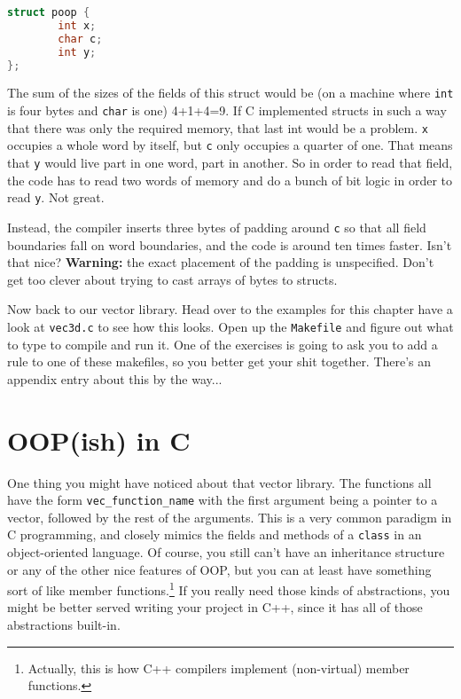 \documentclass[ebook,11pt,oneside,openany]{memoir}
\newcommand{\cf}[1]{\texttt{#1}}
\begin{document}
\begin{lstlisting}[language=C]
struct poop {
        int x;
        char c;
        int y;
};
\end{lstlisting}

The sum of the sizes of the fields of this struct would be (on a machine where \cf{int} is four bytes and \cf{char} is one) 4+1+4=9. If C implemented structs in such a way that there was only the required memory, that last int would be a problem. \cf{x} occupies a whole word by itself, but \cf{c} only occupies a quarter of one. That means that \cf{y} would live part in one word, part in another. So in order to read that field, the code has to read two words of memory and do a bunch of bit logic in order to read \cf{y}. Not great.

Instead, the compiler inserts three bytes of padding around \cf{c} so that all field boundaries fall on word boundaries, and the code is around ten times faster. Isn't that nice? \textbf{Warning:} the exact placement of the padding is unspecified. Don't get too clever about trying to cast arrays of bytes to structs.

Now back to our vector library. Head over to the examples for this chapter have a look at \cf{vec3d.c} to see how this looks. Open up the \cf{Makefile} and figure out what to type to compile and run it. One of the exercises is going to ask you to add a rule to one of these makefiles, so you better get your shit together. There's an appendix entry about this by the way...

\section{OOP(ish) in C}

One thing you might have noticed about that vector library. The functions all have the form \cf{vec\_function\_name} with the first argument being a pointer to a vector, followed by the rest of the arguments. This is a very common paradigm in C programming, and closely mimics the fields and methods of a \cf{class} in an object-oriented language. Of course, you still can't have an inheritance structure or any of the other nice features of OOP, but you can at least have something sort of like member functions.\footnote{Actually, this is how C++ compilers implement (non-virtual) member functions.} If you really need those kinds of abstractions, you might be better served writing your project in C++, since it has all of those abstractions built-in.
\end{document}
